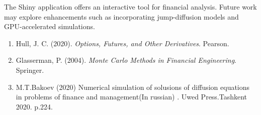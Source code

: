 \begin{talk}
The Shiny application offers an interactive tool for financial analysis. Future work may explore enhancements such as incorporating jump-diffusion models and GPU-accelerated simulations.
\medskip

\begin{enumerate}
	\item Hull, J. C. (2020). \textit{Options, Futures, and Other Derivatives}. Pearson.
	\item Glasserman, P. (2004). \textit{Monte Carlo Methods in Financial Engineering}. Springer.
	\item M.T.Bakoev (2020) Numerical simulation of solusions of diffusion equations in problems of finance and management(In russian) . Uwed Press.Tashkent 2020. p.224.
	
\end{enumerate}

\end{talk}
